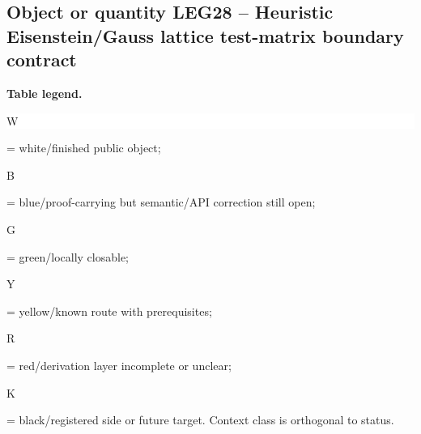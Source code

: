 \subsection*{Object or quantity LEG28 -- Heuristic Eisenstein/\allowbreak{}Gauss lattice test-matrix boundary contract}
\hypertarget{objproof:LEG28}{}
\par\smallskip\noindent\begin{minipage}{0.99\linewidth}\footnotesize\raggedright\textbf{Table legend.} \colorbox{white}{\strut W} = white/finished public object; \colorbox{cyan!20}{\strut B} = blue/proof-carrying but semantic/API correction still open; \colorbox{green!18}{\strut G} = green/locally closable; \colorbox{yellow!25}{\strut Y} = yellow/known route with prerequisites; \colorbox{red!20}{\strut R} = red/derivation layer incomplete or unclear; \colorbox{black!18}{\strut K} = black/registered side or future target. Context class is orthogonal to status.\end{minipage}\par\vspace{0.25em}
